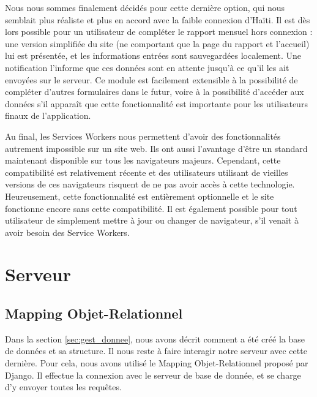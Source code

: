 \documentclass{EPL-master-thesis-covers-FR}
\begin{document}
				Nous nous sommes finalement décidés pour cette dernière option, qui nous semblait plus réaliste et plus en accord avec la faible connexion d'Haïti. Il est dès lors possible pour un utilisateur de compléter le rapport mensuel hors connexion : une version simplifiée du site (ne comportant que la page du rapport et l'accueil) lui est présentée, et les informations entrées sont sauvegardées localement. Une notification l'informe que ces données sont en attente jusqu'à ce qu'il les ait envoyées sur le serveur. Ce module est facilement extensible à la possibilité de compléter d'autres formulaires dans le futur, voire à la possibilité d'accéder aux données s'il apparaît que cette fonctionnalité est importante pour les utilisateurs finaux de l'application.

				Au final, les Services Workers nous permettent d'avoir des fonctionnalités autrement impossible sur un site web. Ils ont aussi l'avantage d'être un standard maintenant disponible sur tous les navigateurs majeurs. Cependant, cette compatibilité est relativement récente et des utilisateurs utilisant de vieilles versions de ces navigateurs risquent de ne pas avoir accès à cette technologie. Heureusement, cette fonctionnalité est entièrement optionnelle et le site fonctionne encore sans cette compatibilité. Il est également possible pour tout utilisateur de simplement mettre à jour ou changer de navigateur, s'il venait à avoir besoin des Service Workers.


		\section{Serveur}
			\label{sec:serveur}



			\subsection{Mapping Objet-Relationnel}

				Dans la section \ref{sec:gest_donnee}, nous avons décrit comment a été créé la base de données et sa structure. Il nous reste à faire interagir notre serveur avec cette dernière. Pour cela, nous avons utilisé le Mapping Objet-Relationnel proposé par Django. Il effectue la connexion avec le serveur de base de donnée, et se charge d'y envoyer toutes les requêtes.
\end{document}
